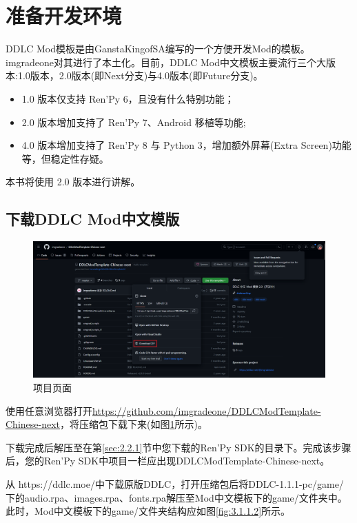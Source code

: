 \section{准备开发环境}
DDLC Mod模板是由GanstaKingofSA编写的一个方便开发Mod的模板。imgradeone对其进行了本土化。目前，DDLC Mod中文模板主要流行三个大版本:1.0版本，2.0版本(即Next分支)与4.0版本(即Future分支)。
\begin{itemize}
    \item 1.0 版本仅支持 Ren'Py 6，且没有什么特别功能；
    \item 2.0 版本增加支持了 Ren'Py 7、Android 移植等功能;
    \item 4.0 版本增加支持了 Ren'Py 8 与 Python 3，增加额外屏幕(Extra Screen)功能等，但稳定性存疑。
\end{itemize}

本书将使用 2.0 版本进行讲解。

\subsection{下载DDLC Mod中文模版}

\begin{figure}[htb]
    \centering
    \includegraphics[scale=.15]{Pictures/2/2.1/2.1.1}
    \caption{项目页面}
    \label{fig:3.1.1.1}
\end{figure}
使用任意浏览器打开\url{https://github.com/imgradeone/DDLCModTemplate-Chinese-next}，将压缩包下载下来(如图\ref{fig:3.1.1.1}所示)。

下载完成后解压至在第\ref{sec:2.2.1}节中您下载的Ren'Py SDK的目录下。完成该步骤后，您的Ren'Py SDK中项目一栏应出现DDLCModTemplate-Chinese-next。

从 https://ddlc.moe/中下载原版DDLC，打开压缩包后将DDLC-1.1.1-pc/game/下的audio.rpa、images.rpa、fonts.rpa解压至Mod中文模板下的game/文件夹中。此时，Mod中文模板下的game/文件夹结构应如图\ref{fig:3.1.1.2}所示。


